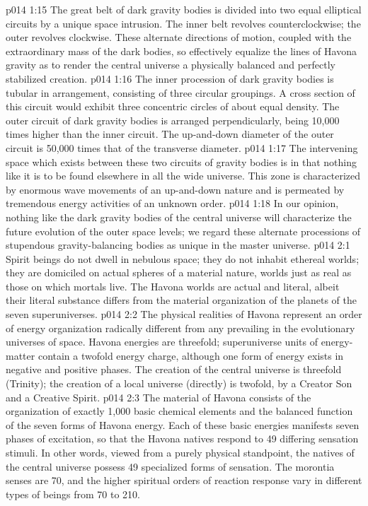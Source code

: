 \vs p014 1:15 The great belt of dark gravity bodies is divided into two equal elliptical circuits by a unique space intrusion. The inner belt revolves counterclockwise; the outer revolves clockwise. These alternate directions of motion, coupled with the extraordinary mass of the dark bodies, so effectively equalize the lines of Havona gravity as to render the central universe a physically balanced and perfectly stabilized creation.
\vs p014 1:16 The inner procession of dark gravity bodies is tubular in arrangement, consisting of three circular groupings. A cross section of this circuit would exhibit three concentric circles of about equal density. The outer circuit of dark gravity bodies is arranged perpendicularly, being 10,000 times higher than the inner circuit. The up\hyp{}and\hyp{}down diameter of the outer circuit is 50,000 times that of the transverse diameter.
\vs p014 1:17 The intervening space which exists between these two circuits of gravity bodies is  in that nothing like it is to be found elsewhere in all the wide universe. This zone is characterized by enormous wave movements of an up\hyp{}and\hyp{}down nature and is permeated by tremendous energy activities of an unknown order.
\vs p014 1:18 In our opinion, nothing like the dark gravity bodies of the central universe will characterize the future evolution of the outer space levels; we regard these alternate processions of stupendous gravity\hyp{}balancing bodies as unique in the master universe.
\vs p014 2:1 Spirit beings do not dwell in nebulous space; they do not inhabit ethereal worlds; they are domiciled on actual spheres of a material nature, worlds just as real as those on which mortals live. The Havona worlds are actual and literal, albeit their literal substance differs from the material organization of the planets of the seven superuniverses.
\vs p014 2:2 The physical realities of Havona represent an order of energy organization radically different from any prevailing in the evolutionary universes of space. Havona energies are threefold; superuniverse units of energy\hyp{}matter contain a twofold energy charge, although one form of energy exists in negative and positive phases. The creation of the central universe is threefold (Trinity); the creation of a local universe (directly) is twofold, by a Creator Son and a Creative Spirit.
\vs p014 2:3 The material of Havona consists of the organization of exactly 1,000 basic chemical elements and the balanced function of the seven forms of Havona energy. Each of these basic energies manifests seven phases of excitation, so that the Havona natives respond to 49 differing sensation stimuli. In other words, viewed from a purely physical standpoint, the natives of the central universe possess 49 specialized forms of sensation. The morontia senses are 70, and the higher spiritual orders of reaction response vary in different types of beings from 70 to 210.
